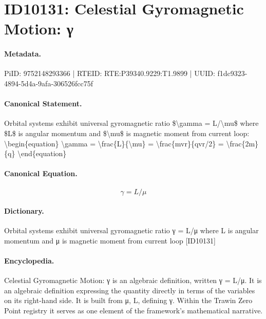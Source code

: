 \section*{ID10131: Celestial Gyromagnetic Motion: γ}
\paragraph{Metadata.}
PiID: 9752148293366 | RTEID: RTE:P39340.9229:T1.9899 | UUID: f1dc9323-4894-5d4a-9afa-306526fcc75f

\paragraph{Canonical Statement.}
Orbital systems exhibit universal gyromagnetic ratio \$\textbackslash{}gamma = L/\textbackslash{}mu\$ where \$L\$ is angular momentum and \$\textbackslash{}mu\$ is magnetic moment from current loop: \textbackslash{}begin\{equation\} \textbackslash{}gamma = \textbackslash{}frac\{L\}\{\textbackslash{}mu\} = \textbackslash{}frac\{mvr\}\{qvr/2\} = \textbackslash{}frac\{2m\}\{q\} \textbackslash{}end\{equation\}

\paragraph{Canonical Equation.}
\[
\gamma = L/\mu
\]

\paragraph{Dictionary.}
Orbital systems exhibit universal gyromagnetic ratio γ = L/μ where L is angular momentum and μ is magnetic moment from current loop [ID10131]

\paragraph{Encyclopedia.}
Celestial Gyromagnetic Motion: γ is an algebraic definition, written γ = L/μ. It is an algebraic definition expressing the quantity directly in terms of the variables on its right-hand side. It is built from μ, L, defining γ. Within the Trawin Zero Point registry it serves as one element of the framework's mathematical narrative.
